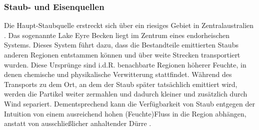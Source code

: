 \documentclass[12pt,a4paper,onecolumn]{scrartcl}
\begin{document}
\subsubsection{Staub- und Eisenquellen} \label{sec:staubquellen}
Die Haupt-Staubquelle erstreckt sich über ein riesiges Gebiet in Zentralaustralien \citep{Shao.2011}. Das sogenannte Lake Eyre Becken liegt im Zentrum eines endorheischen Systems. Dieses System führt dazu, dass die Bestandteile emittierten Staubs anderen Regionen entstammen können und über weite Strecken transportiert wurden. Diese Ursprünge sind i.d.R. benachbarte Regionen höherer Feuchte, in denen chemische und physikalische Verwitterung stattfindet. Während des Transports zu dem Ort, an dem der Staub später tatsächlich emittiert wird, werden die Partikel weiter zermahlen und dadurch kleiner und zusätzlich durch Wind separiert. Dementsprechend kann die Verfügbarkeit von Staub entgegen der Intuition von einem ausreichend hohen (Feuchte)Fluss in die Region abhängen, anstatt von ausschließlicher anhaltender Dürre \citep{Marx.2018}.
\end{document}
